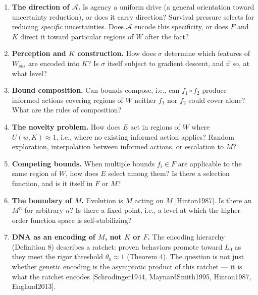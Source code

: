 \documentclass[
]{article}
\begin{document}
\begin{enumerate}
  Formal derivation of this claim from thermodynamic first principles
  (connecting \(U_{lethal}^d\) to physical entropy thresholds and
  demonstrating the inevitability of primitive \(\mathcal{A}\) from
  dissipative system dynamics) remains open. See {[}Prigogine1984{]}
  (dissipative structures), {[}England2013{]} (dissipative adaptation),
  and {[}Schrodinger1944{]} (negative entropy and life) for adjacent
  physical frameworks.
\item
  \textbf{The direction of \(\mathcal{A}\).} Is agency a uniform drive
  (a general orientation toward uncertainty reduction), or does it carry
  direction? Survival pressure selects for reducing \emph{specific}
  uncertainties. Does \(\mathcal{A}\) encode this specificity, or does
  \(F\) and \(K\) direct it toward particular regions of \(W\) after the
  fact?
\item
  \textbf{Perception and \(K\) construction.} How does \(\sigma\)
  determine which features of \(W_{obs}\) are encoded into \(K\)? Is
  \(\sigma\) itself subject to gradient descent, and if so, at what
  level?
\item
  \textbf{Bound composition.} Can bounds compose, i.e., can
  \(f_1 \circ f_2\) produce informed actions covering regions of \(W\)
  neither \(f_1\) nor \(f_2\) could cover alone? What are the rules of
  composition?
\item
  \textbf{The novelty problem.} How does \(E\) act in regions of \(W\)
  where \(U(w, K) \approx 1\), i.e., where no existing informed action
  applies? Random exploration, interpolation between informed actions,
  or escalation to \(M\)?
\item
  \textbf{Competing bounds.} When multiple bounds \(f_i \in F\) are
  applicable to the same region of \(W\), how does \(E\) select among
  them? Is there a selection function, and is it itself in \(F\) or
  \(M\)?
\item
  \textbf{The boundary of \(M\).} Evolution is \(M\) acting on \(M\)
  {[}Hinton1987{]}. Is there an \(M^n\) for arbitrary \(n\)? Is there a
  fixed point, i.e., a level at which the higher-order function space is
  self-stabilizing?
\item
  \textbf{DNA as an encoding of \(M\), not \(K\) or \(F\).} The encoding
  hierarchy (Definition 8) describes a ratchet: proven behaviors promote
  toward \(L_0\) as they meet the rigor threshold \(\theta_0 \approx 1\)
  (Theorem 4). The question is not just whether genetic encoding is the
  asymptotic product of this ratchet --- it is what the ratchet encodes
  {[}Schrodinger1944, MaynardSmith1995, Hinton1987, England2013{]}.


\end{enumerate}
\end{document}
